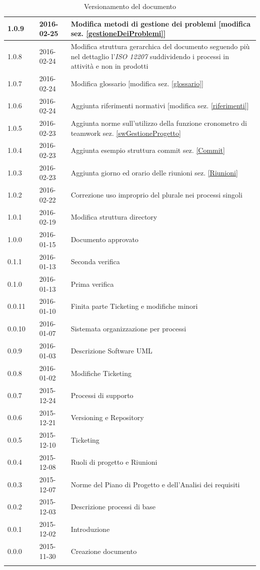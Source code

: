 \documentclass[12pt,a4paper]{article}
\begin{document}
\begin{center}
\begin{longtable}[H]{p{} p{} p{} p{}}
		\midrule
		1.0.9 & \TP{} & 2016-02-25 & Modifica metodi di gestione dei problemi [modifica sez. \ref{gestioneDeiProblemi}]  \\*
		\midrule
		1.0.8 & \TP{} & 2016-02-24 & Modifica struttura gerarchica del documento seguendo più nel dettaglio l'\textit{ISO 12207} suddividendo i processi in attività e non in prodotti \\*
		\midrule
		1.0.7 & \TP{} & 2016-02-24 & Modifica glossario [modifica sez. \ref{glossario}] \\*
		\midrule
		1.0.6 & \TP{} & 2016-02-24 & Aggiunta riferimenti normativi [modifica sez. \ref{riferimenti}] \\*
		\midrule
		1.0.5 & \TP & 2016-02-23 & Aggiunta norme sull'utilizzo della funzione cronometro di teamwork sez. \ref{swGestioneProgetto}\\*
		\midrule
		1.0.4 & \TP & 2016-02-23 & Aggiunta esempio struttura commit sez. \ref{Commit}\\*
		\midrule
		1.0.3 & \TP & 2016-02-23 & Aggiunta giorno ed orario delle riunioni sez. \ref{Riunioni}\\*
		\midrule
		1.0.2 & \TP & 2016-02-22 & Correzione uso improprio del plurale nei processi singoli \\*
		\midrule
		1.0.1 & \TP & 2016-02-19 & Modifica struttura directory \\*
		\midrule
		1.0.0 & \IB & 2016-01-15 & Documento approvato \\*
		\midrule
		0.1.1 & \TP & 2016-01-13 & Seconda verifica \\*
		\midrule
		0.1.0 & \WS & 2016-01-13 & Prima verifica \\*
		\midrule
		0.0.11 & \NDC & 2016-01-10 & Finita parte Ticketing e modifiche minori \\*
		\midrule
		0.0.10 & \NDC & 2016-01-07 & Sistemata organizzazione per processi \\*
		\midrule
		0.0.9 & \AVE & 2016-01-03 & Descrizione Software UML \\*
		\midrule
		0.0.8 & \AVE & 2016-01-02 & Modifiche Ticketing \\*
		\midrule
		0.0.7 & \NDC & 2015-12-24 & Processi di supporto \\*
		\midrule
		0.0.6 & \AVI & 2015-12-21 & Versioning e Repository \\*
		\midrule
		0.0.5 & \AVE & 2015-12-10 & Ticketing \\*
		\midrule
		0.0.4 & \AVE & 2015-12-08 & Ruoli di progetto e Riunioni \\*
		\midrule
		0.0.3 & \AVI & 2015-12-07 & Norme del Piano di Progetto e dell'Analisi dei requisiti \\*
		\midrule
		0.0.2 & \AVI & 2015-12-03 & Descrizione processi di base \\*
		\midrule 
		0.0.1 & \NDC & 2015-12-02 & Introduzione \\*
		\midrule
		0.0.0 & \NDC & 2015-11-30 & Creazione documento \\*
		\bottomrule
		\caption{Versionamento del documento}
		\label{tabVers1}
	\end{longtable}
\end{center}
\end{document}
